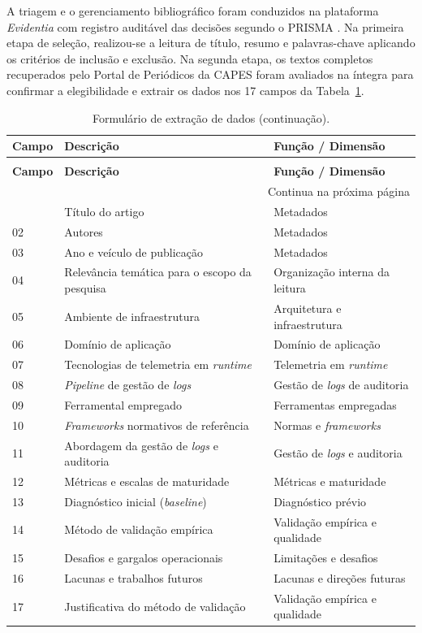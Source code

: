 A triagem e o gerenciamento bibliográfico foram conduzidos na plataforma \textit{Evidentia} com registro auditável das decisões segundo o PRISMA \cite{kitchenham2007}. Na primeira etapa de seleção, realizou-se a leitura de título, resumo e palavras-chave aplicando os critérios de inclusão e exclusão. Na segunda etapa, os textos completos recuperados pelo Portal de Periódicos da CAPES foram avaliados na íntegra para confirmar a elegibilidade e extrair os dados nos 17 campos da Tabela~\ref{tab:rsl_formulario}.

\begin{longtable}{p{1.5cm}p{8.0cm}p{4.1cm}}
    \caption{Formulário de extração de dados.}\label{tab:rsl_formulario}\\
    \hline
    \textbf{Campo} & \textbf{Descrição} & \textbf{Função / Dimensão} \\ \hline
    \endfirsthead
    \caption[]{Formulário de extração de dados (continuação).}\\
    \hline
    \textbf{Campo} & \textbf{Descrição} & \textbf{Função / Dimensão} \\ \hline
    \endhead
    \hline \multicolumn{3}{r}{\footnotesize Continua na próxima página} \\
    \endfoot
    \hline
    \endlastfoot
    01 & Título do artigo & Metadados \\ \hline
    02 & Autores & Metadados \\ \hline
    03 & Ano e veículo de publicação & Metadados \\ \hline
    04 & Relevância temática para o escopo da pesquisa & Organização interna da leitura \\ \hline
    05 & Ambiente de infraestrutura & Arquitetura e infraestrutura \\ \hline
    06 & Domínio de aplicação & Domínio de aplicação \\ \hline
    07 & Tecnologias de telemetria em \textit{runtime} & Telemetria em \textit{runtime} \\ \hline
    08 & \textit{Pipeline} de gestão de \textit{logs} & Gestão de \textit{logs} de auditoria \\ \hline
    09 & Ferramental empregado & Ferramentas empregadas \\ \hline
    10 & \textit{Frameworks} normativos de referência & Normas e \textit{frameworks} \\ \hline
    11 & Abordagem da gestão de \textit{logs} e auditoria & Gestão de \textit{logs} e auditoria \\ \hline
    12 & Métricas e escalas de maturidade & Métricas e maturidade \\ \hline
    13 & Diagnóstico inicial (\textit{baseline}) & Diagnóstico prévio \\ \hline
    14 & Método de validação empírica & Validação empírica e qualidade \\ \hline
    15 & Desafios e gargalos operacionais & Limitações e desafios \\ \hline
    16 & Lacunas e trabalhos futuros & Lacunas e direções futuras \\ \hline
    17 & Justificativa do método de validação & Validação empírica e qualidade \\ \hline
\end{longtable}
